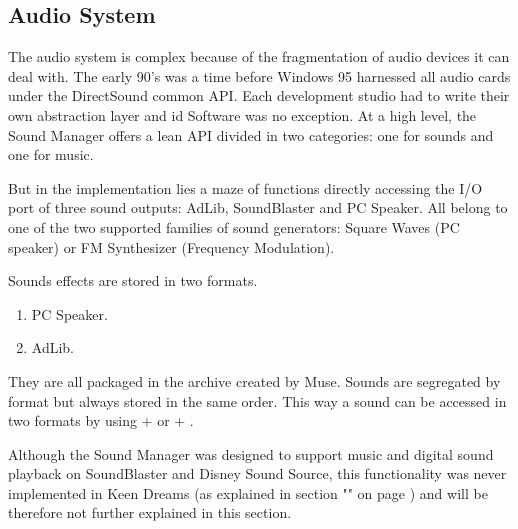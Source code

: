 \documentclass[book.tex]{subfiles}
\begin{document}
\par
\begin{minipage}{\textwidth}
  
\end{minipage}
\label{time_ticks}


\pagebreak
\subsection{Audio System}
The audio system is complex because of the fragmentation of audio devices it can deal with. The early 90's was a time before Windows 95 harnessed all audio cards under the DirectSound common API. Each development studio had to write their own abstraction layer and id Software was no exception. At a high level, the Sound Manager offers a lean API divided in two categories: one for sounds and one for music.\\

\par
\begin{minipage}{\textwidth}

\end{minipage}
\par
\vspace{10pt}

But in the implementation lies a maze of functions directly accessing the I/O port of three sound outputs: AdLib, SoundBlaster and PC Speaker. All belong to one of the two supported families of sound generators: Square Waves (PC speaker) or FM Synthesizer (Frequency Modulation). \\

\par
Sounds effects are stored in two formats.
\begin{enumerate}
\item PC Speaker.
\item AdLib.
\end{enumerate}

They are all packaged in the  archive created by Muse. Sounds are segregated by format but always stored in the same order. This way a sound can be accessed in two formats by using  +  or  + .\\

\par
Although the Sound Manager was designed to support music and digital sound playback on SoundBlaster and Disney Sound Source, this functionality was never implemented in Keen Dreams (as explained in section "" on page \pageref{section:audio}) and will be therefore not further explained in this section.\\
\end{document}
